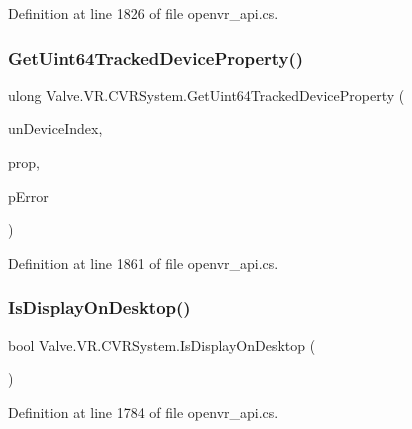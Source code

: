Definition at line 1826 of file openvr\+\_\+api.\+cs.

\mbox{\label{class_valve_1_1_v_r_1_1_c_v_r_system_a2cde74d7011dc5d9f2727c29f3a9e8c1}} 
\subsubsection{\texorpdfstring{GetUint64TrackedDeviceProperty()}{GetUint64TrackedDeviceProperty()}}
{\footnotesize\ttfamily ulong Valve.\+V\+R.\+C\+V\+R\+System.\+Get\+Uint64\+Tracked\+Device\+Property (\begin{DoxyParamCaption}\item[{uint}]{un\+Device\+Index,  }\item[{\mbox{\hyperlink{namespace_valve_1_1_v_r_ab060521ead7273986988fc4897e52482}{E\+Tracked\+Device\+Property}}}]{prop,  }\item[{ref \mbox{\hyperlink{namespace_valve_1_1_v_r_aab6684f03930a2d2cf22ed66b437e47b}{E\+Tracked\+Property\+Error}}}]{p\+Error }\end{DoxyParamCaption})}



Definition at line 1861 of file openvr\+\_\+api.\+cs.

\mbox{\label{class_valve_1_1_v_r_1_1_c_v_r_system_a9c4ab5e7989d6c1938159b7a1ec42b14}} 
\subsubsection{\texorpdfstring{IsDisplayOnDesktop()}{IsDisplayOnDesktop()}}
{\footnotesize\ttfamily bool Valve.\+V\+R.\+C\+V\+R\+System.\+Is\+Display\+On\+Desktop (\begin{DoxyParamCaption}{ }\end{DoxyParamCaption})}



Definition at line 1784 of file openvr\+\_\+api.\+cs.

\mbox{\label{class_valve_1_1_v_r_1_1_c_v_r_system_a911d8daa1d9b5d2d8cc9b7e36399187e}} 
